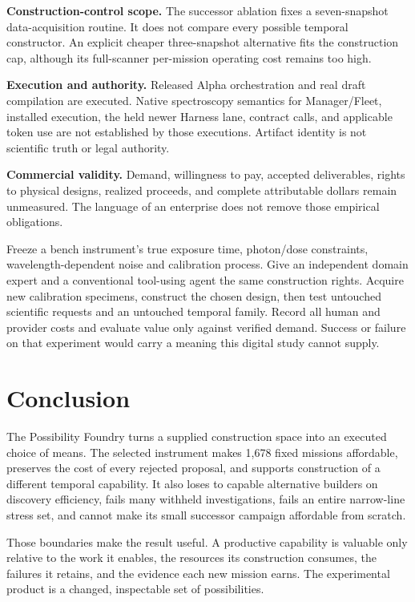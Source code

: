 \documentclass[11pt,a4paper]{article}
\begin{document}
\textbf{Construction-control scope.} The successor ablation fixes a seven-snapshot data-acquisition routine. It does not compare every possible temporal constructor. An explicit cheaper three-snapshot alternative fits the construction cap, although its full-scanner per-mission operating cost remains too high.

\textbf{Execution and authority.} Released Alpha orchestration and real draft compilation are executed. Native spectroscopy semantics for Manager/Fleet, installed execution, the held newer Harness lane, contract calls, and applicable token use are not established by those executions. Artifact identity is not scientific truth or legal authority.

\textbf{Commercial validity.} Demand, willingness to pay, accepted deliverables, rights to physical designs, realized proceeds, and complete attributable dollars remain unmeasured. The language of an enterprise does not remove those empirical obligations.

\begin{claimbox}
Freeze a bench instrument's true exposure time, photon/dose constraints, wavelength-dependent noise and calibration process. Give an independent domain expert and a conventional tool-using agent the same construction rights. Acquire new calibration specimens, construct the chosen design, then test untouched scientific requests and an untouched temporal family. Record all human and provider costs and evaluate value only against verified demand. Success or failure on that experiment would carry a meaning this digital study cannot supply.
\end{claimbox}

\section{Conclusion}

The Possibility Foundry turns a supplied construction space into an executed choice of means. The selected instrument makes 1,678 fixed missions affordable, preserves the cost of every rejected proposal, and supports construction of a different temporal capability. It also loses to capable alternative builders on discovery efficiency, fails many withheld investigations, fails an entire narrow-line stress set, and cannot make its small successor campaign affordable from scratch.

Those boundaries make the result useful. A productive capability is valuable only relative to the work it enables, the resources its construction consumes, the failures it retains, and the evidence each new mission earns. The experimental product is a changed, inspectable set of possibilities.
\end{document}
